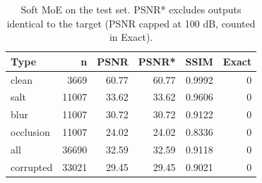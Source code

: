 \begin{table}[t]
\centering
\caption{Soft MoE on the test set. PSNR* excludes outputs identical to the target (PSNR capped at 100 dB, counted in Exact).}
\label{tab:task3_by_type}
\begin{tabular}{lrrrrr}
\toprule
Type & n & PSNR & PSNR* & SSIM & Exact \\
\midrule
clean & 3669 & 60.77 & 60.77 & 0.9992 & 0 \\
salt & 11007 & 33.62 & 33.62 & 0.9606 & 0 \\
blur & 11007 & 30.72 & 30.72 & 0.9122 & 0 \\
occlusion & 11007 & 24.02 & 24.02 & 0.8336 & 0 \\
all & 36690 & 32.59 & 32.59 & 0.9118 & 0 \\
corrupted & 33021 & 29.45 & 29.45 & 0.9021 & 0 \\
\bottomrule
\end{tabular}
\end{table}
